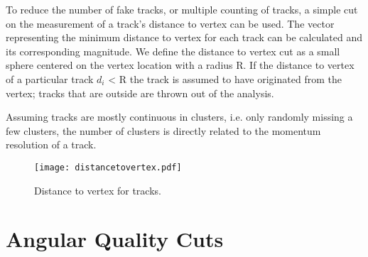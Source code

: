 To reduce the number of fake tracks, or multiple counting of tracks, a simple cut on the measurement of a track's distance to vertex can be used. The vector representing the minimum distance to vertex for each track can be calculated and its corresponding magnitude. We define the distance to vertex cut as a small sphere centered on the vertex location with a radius R. If the distance to vertex of a particular track $d_i$ < R the track is assumed to have originated from the vertex; tracks that are outside are thrown out of the analysis. 

Assuming tracks are mostly continuous in clusters, i.e. only randomly missing a few clusters, the number of clusters is directly related to the momentum resolution of a track. 


\begin{figure}[!htb]
\texttt{[image: distancetovertex.pdf]}
\label{fig:poca}
\caption{Distance to vertex for tracks.}
\end{figure}


\section{Angular Quality Cuts}

